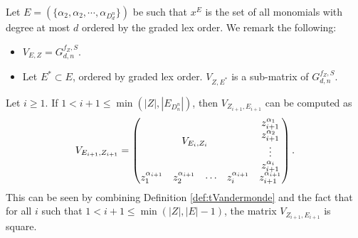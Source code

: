 \documentclass[11pt]{llncs}
\begin{document}
\begin{remark}\label{rem:subsetOfReedMuller}
Let $E = (\{\alpha_2, \alpha_2, \cdots, \alpha_{D_d^n}\})$ be such that $x^E$ is the set of all monomials with degree at most $d$ ordered by the graded lex order. 
    We remark the following:
    \begin{itemize}
        \item $V_{E,Z} = G_{d,n}^{f_{Z},S}$.
        \item Let $E^{*}\subset E$, ordered by graded lex order. $V_{Z,E^{*}}$ is a sub-matrix of $G_{d,n}^{f_Z, S}$.
    \end{itemize}
\end{remark}

\begin{remark}\label{rem:squareConstruction}
 Let $i\geq 1$. If $1< i+1 \leq \min{\left(|Z|, |E_{D_n^n}|\right)}$, then $V_{Z_{i+1}, E_{i+1}}$ can be computed as
    \begin{align*}
        V_{E_{i+1}, Z_{i+1}} = 
        \begin{pmatrix}
        \multicolumn{4}{c}{\multirow{4}{*}{$V_{E_{i}, Z_{i}}$}} & z_{i+1}^{\alpha_{1}}\\
        & & & & z_{i+1}^{\alpha_{2}}\\
        & & & & \vdots\\
        & & & & z_{i+1}^{\alpha_{i}}\\
        z_1^{\alpha_{i+1}} & z_2^{\alpha_{i+1}}& \cdots & z_{i}^{\alpha_{i+1}} & z_{i+1}^{\alpha_{i+1}}
    \end{pmatrix}.
    \end{align*}
    This can be seen by combining Definition \ref{def:tVandermonde} and the fact that for all $i$ such that $1< i+1 \leq \min{\left(|Z|, |E|-1\right)}$, the matrix $V_{Z_{i+1}, E_{i+1}}$ is square.
\end{remark}
\end{document}
